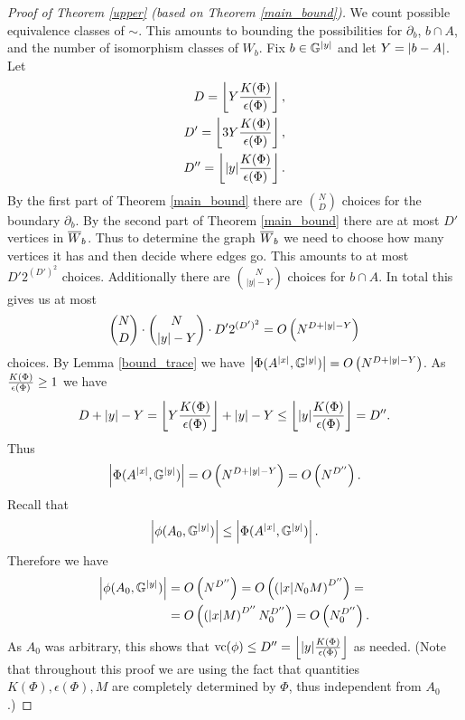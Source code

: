 \begin{proof} [Proof of Theorem \ref{upper} (based on Theorem \ref{main_bound})]
  We count possible equivalence classes of $\sim$.
  This amounts to bounding the possibilities for $\partial_b$, $b \cap A$, and the number of isomorphism classes of $W_b$.
  Fix $b \in \mathbb G^{|y|}$ and let $Y = \left|b - A\right|$.
  Let
  \begin{align*}
    D = \left \lfloor Y \frac{K(\Phi)}{\epsilon(\Phi)} \right \rfloor, \\ 
    D' = \left \lfloor 3Y \frac{K(\Phi)}{\epsilon(\Phi)} \right \rfloor, \\
    D'' = \left \lfloor |y|\frac{K(\Phi)}{\epsilon(\Phi)} \right \rfloor.
  \end{align*}
  By the first part of Theorem \ref{main_bound} there are $N \choose D$ choices for the boundary $\partial_b$.
  By the second part of Theorem \ref{main_bound} there are at most $D'$ vertices in ${\overline{W}}_b$.
  Thus to determine the graph ${\overline{W}}_b$ we need to choose how many vertices it has and then decide where edges go.
  This amounts to at most $D' 2^{(D')^2}$ choices.
  Additionally there are $N \choose |y| - Y$ choices for $b \cap A$.
  In total this gives us at most
  \begin{align*}
    {N \choose D} \cdot {N \choose |y| - Y} \cdot D' 2^{(D')^2} = O\left(N^{D + |y| - Y}\right)
  \end{align*}
  choices.
  By Lemma \ref{bound_trace} we have $\left|\Phi(A^{|x|}, \mathbb G^{|y|})\right| = O\left(N^{D + |y| - Y}\right)$.
  As $\frac{K(\Phi)}{\epsilon(\Phi)} \geq 1$ we have
  \begin{align*}
    {D + |y| - Y} = {\left \lfloor Y \frac{K(\Phi)}{\epsilon(\Phi)} \right \rfloor + |y| - Y} \leq {\left \lfloor |y| \frac{K(\Phi)}{\epsilon(\Phi)}\right \rfloor } = D''.
  \end{align*}
  Thus 
  \begin{align*}
    \left|\Phi(A^{|x|}, \mathbb G^{|y|})\right| = O\left(N^{D + |y| - Y}\right) = O\left(N^{D''}\right).
  \end{align*}
  Recall that 
  \begin{align*}
    \left|\phi(A_0, \mathbb G^{|y|})\right| \leq \left|\Phi(A^{|x|}, \mathbb G^{|y|})\right|.    
  \end{align*}
  Therefore we have
  \begin{align*}
    \left|\phi(A_0, \mathbb G^{|y|})\right| &= O\left(N^{D''}\right) = O\left(\left(|x| N_0 M\right)^{D''}\right) = \\
    &= O\left(\left(|x| M\right)^{D''} N_0^{D''}\right) = O\left(N_0^{D''}\right).
  \end{align*}
  As $A_0$ was arbitrary, this shows that $\operatorname{vc}(\phi) \leq D'' = \left \lfloor |y|\frac{K(\Phi)}{\epsilon(\Phi)} \right \rfloor$ as needed.
  (Note that throughout this proof we are using the fact that quantities $K(\Phi), \epsilon(\Phi), M$ are completely determined by $\Phi$,
  thus independent from $A_0$.)
\end{proof}

